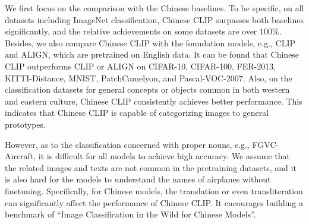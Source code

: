 We first focus on the comparison with the Chinese baselines. 
To be specific, on all datasets including ImageNet classification, Chinese CLIP surpasses both baselines significantly, and the relative achievements on some datasets are over $100\%$. 
Besides, we also compare Chinese CLIP with the foundation models, e.g., CLIP and ALIGN, which are pretrained on English data. 
It can be found that Chinese CLIP outperforms CLIP or ALIGN on CIFAR-10, CIFAR-100, FER-2013, KITTI-Distance, MNIST, PatchCamelyon, and Pascal-VOC-2007. 
Also, on the classification datasets for general concepts or objects common in both western and eastern culture, Chinese CLIP consistently achieves better performance. 
This indicates that Chinese CLIP is capable of categorizing images to general prototypes. 

However, as to the classification concerned with proper nouns, e.g., FGVC-Aircraft, it is difficult for all models to achieve high accuracy. 
We assume that the related images and texts are not common in the pretraining datasets, and it is also hard for the models to understand the names of airplanes without finetuning. 
Specifically, for Chinese models, the translation or even transliteration can significantly affect the performance of Chinese CLIP. It encourages building a benchmark of ``Image Classification in the Wild for Chinese Models''. 

